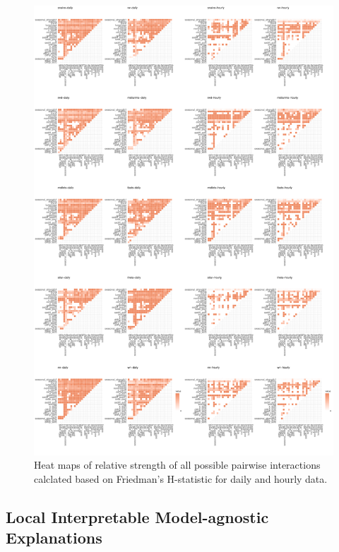 \documentclass[11pt,a4paper,]{article}
\begin{document}
\begin{figure}
\centering
\includegraphics{figures/friedmandailyhourly-1.pdf}
\caption{\label{fig:friedmandailyhourly}Heat maps of relative strength of
all possible pairwise interactions calclated based on Friedman's
H-statistic for daily and hourly data.}
\end{figure}

\newpage

\subsection{Local Interpretable Model-agnostic
Explanations}\label{local-interpretable-model-agnostic-explanations}
\end{document}
